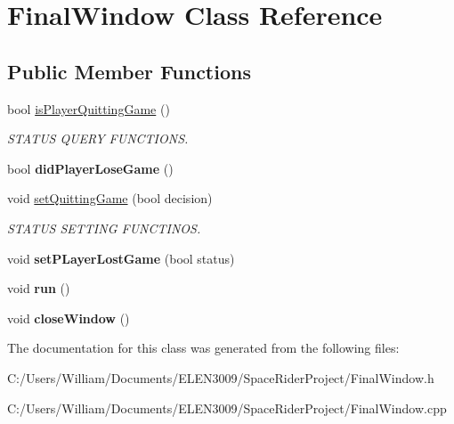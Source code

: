\hypertarget{class_final_window}{}\section{Final\+Window Class Reference}
\label{class_final_window}
\subsection*{Public Member Functions}
\begin{DoxyCompactItemize}
\item 
\mbox{\label{class_final_window_aa719a7ffb084df7f00a72fdb0d843c38}} 
bool \hyperlink{class_final_window_aa719a7ffb084df7f00a72fdb0d843c38}{is\+Player\+Quitting\+Game} ()
\begin{DoxyCompactList}\small\item\em S\+T\+A\+T\+US Q\+U\+E\+RY F\+U\+N\+C\+T\+I\+O\+NS. \end{DoxyCompactList}\item 
\mbox{\label{class_final_window_a793b0fa86eac2eef3256d9d2f1f3711b}} 
bool {\bfseries did\+Player\+Lose\+Game} ()
\item 
\mbox{\label{class_final_window_afd73d524fd2f10486d86a2e0057fcb54}} 
void \hyperlink{class_final_window_afd73d524fd2f10486d86a2e0057fcb54}{set\+Quitting\+Game} (bool decision)
\begin{DoxyCompactList}\small\item\em S\+T\+A\+T\+US S\+E\+T\+T\+I\+NG F\+U\+N\+C\+T\+I\+N\+OS. \end{DoxyCompactList}\item 
\mbox{\label{class_final_window_a3ad8ebeede5375c9cd4732e794f076ac}} 
void {\bfseries set\+P\+Layer\+Lost\+Game} (bool status)
\item 
\mbox{\label{class_final_window_ad0ff2789d7ab310a4b70e393f602deff}} 
void {\bfseries run} ()
\item 
\mbox{\label{class_final_window_a3c5b82cb988e1f312c0f459959442e2b}} 
void {\bfseries close\+Window} ()
\end{DoxyCompactItemize}


The documentation for this class was generated from the following files\+:\begin{DoxyCompactItemize}
\item 
C\+:/\+Users/\+William/\+Documents/\+E\+L\+E\+N3009/\+Space\+Rider\+Project/Final\+Window.\+h\item 
C\+:/\+Users/\+William/\+Documents/\+E\+L\+E\+N3009/\+Space\+Rider\+Project/Final\+Window.\+cpp\end{DoxyCompactItemize}

